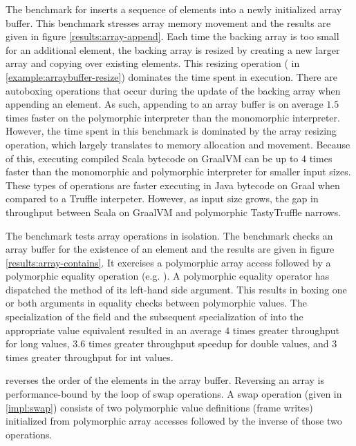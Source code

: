 The benchmark for  inserts a sequence of elements into a newly initialized array buffer. 
This benchmark stresses array memory movement and the results are given in figure \ref{results:array-append}.
Each time the backing array is too small for an additional element, the backing array is resized by creating a new larger array and copying over existing elements.
This resizing operation ( in \ref{example:arraybuffer-resize}) dominates the time spent in execution.
There are autoboxing operations that occur during the update of the backing array when appending an element.
As such, appending to an array buffer is on average $1.5$ times faster on the polymorphic interpreter than the monomorphic interpreter.
However, the time spent in this benchmark is dominated by the array resizing operation, which largely translates to memory allocation and movement.
Because of this, executing compiled Scala bytecode on GraalVM can be up to $4$ times faster than the monomorphic and polymorphic interpreter for smaller input sizes.
These types of operations are faster executing in Java bytecode on Graal when compared to a Truffle interpeter.
However, as input size grows, the gap in throughput between Scala on GraalVM and polymorphic TastyTruffle narrows.

The  benchmark tests array operations in isolation. 
The benchmark checks an array buffer for the existence of an element and the results are given in figure \ref{results:array-contains}.
It exercises a polymorphic array access followed by a polymorphic equality operation (e.g. ).
A polymorphic equality operator has dispatched the  method of its left-hand side argument.
This results in boxing one or both arguments in equality checks between polymorphic values.
The specialization of the  field and the subsequent specialization of  into the appropriate value equivalent resulted in an average $4$ times greater throughput for long values, $3.6$ times greater throughput  speedup for double values, and $3$ times greater throughput for int values.

 reverses the order of the elements in the array buffer.
Reversing an array is performance-bound by the loop of swap operations.
A swap operation (given in \ref{impl:swap}) consists of two polymorphic value definitions (frame writes) initialized from polymorphic array accesses followed by the inverse of those two operations.

